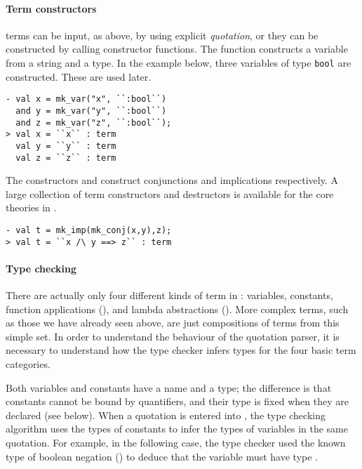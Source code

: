 \paragraph{Term constructors}
\HOL{} terms can be input, as above, by using explicit \emph{quotation}, or they can be constructed by calling \ML{} constructor functions.
The function  constructs a variable from a string and a type.
In the example below, three variables of type {\small\verb|bool|} are constructed.
These are used later.

\begin{session}
\begin{verbatim}
- val x = mk_var("x", ``:bool``)
  and y = mk_var("y", ``:bool``)
  and z = mk_var("z", ``:bool``);
> val x = ``x`` : term
  val y = ``y`` : term
  val z = ``z`` : term
\end{verbatim}
\end{session}

The constructors  and  construct conjunctions and implications respectively.
A large collection of term constructors and destructors is available for the core theories in \HOL.

\begin{session}
\begin{verbatim}
- val t = mk_imp(mk_conj(x,y),z);
> val t = ``x /\ y ==> z`` : term
\end{verbatim}
\end{session}

\paragraph{Type checking}

There are actually only four different kinds of term in \HOL: variables, constants, function applications (), and lambda abstractions ().
More complex terms, such as those we have already seen above, are just compositions of terms from this simple set.
In order to understand the behaviour of the quotation parser, it is necessary to understand how the type checker infers types for the four basic term categories.

Both variables and constants have a name and a type; the difference is that constants cannot be bound by quantifiers, and their type is fixed when they are declared (see below).
When a quotation is entered into \HOL{}, the type checking algorithm uses the types of constants to infer the types of variables in the same quotation.
For example, in the following case, the \HOL{} type checker used the known type  of boolean negation (\holtxt{\td}) to deduce that the variable  must have type .


